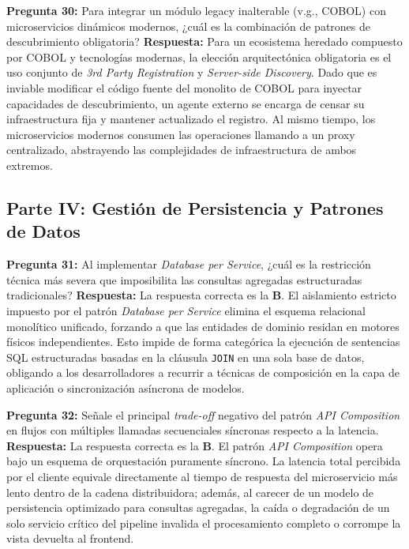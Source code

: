 \vspace{4mm}

\noindent\textbf{Pregunta 30:} Para integrar un módulo legacy inalterable (v.g., COBOL) con microservicios dinámicos modernos, ¿cuál es la combinación de patrones de descubrimiento obligatoria?
\newline
\textbf{Respuesta:} Para un ecosistema heredado compuesto por COBOL y tecnologías modernas, la elección arquitectónica obligatoria es el uso conjunto de \textit{3rd Party Registration} y \textit{Server-side Discovery}. Dado que es inviable modificar el código fuente del monolito de COBOL para inyectar capacidades de descubrimiento, un agente externo se encarga de censar su infraestructura fija y mantener actualizado el registro. Al mismo tiempo, los microservicios modernos consumen las operaciones llamando a un proxy centralizado, abstrayendo las complejidades de infraestructura de ambos extremos.

\subsection*{Parte IV: Gestión de Persistencia y Patrones de Datos}

\noindent\textbf{Pregunta 31:} Al implementar \textit{Database per Service}, ¿cuál es la restricción técnica más severa que imposibilita las consultas agregadas estructuradas tradicionales?
\newline
\textbf{Respuesta:} La respuesta correcta es la \textbf{B}. El aislamiento estricto impuesto por el patrón \textit{Database per Service} elimina el esquema relacional monolítico unificado, forzando a que las entidades de dominio residan en motores físicos independientes. Esto impide de forma categórica la ejecución de sentencias SQL estructuradas basadas en la cláusula \texttt{JOIN} en una sola base de datos, obligando a los desarrolladores a recurrir a técnicas de composición en la capa de aplicación o sincronización asíncrona de modelos.

\vspace{4mm}

\noindent\textbf{Pregunta 32:} Señale el principal \textit{trade-off} negativo del patrón \textit{API Composition} en flujos con múltiples llamadas secuenciales síncronas respecto a la latencia.
\newline
\textbf{Respuesta:} La respuesta correcta es la \textbf{B}. El patrón \textit{API Composition} opera bajo un esquema de orquestación puramente síncrono. La latencia total percibida por el cliente equivale directamente al tiempo de respuesta del microservicio más lento dentro de la cadena distribuidora; además, al carecer de un modelo de persistencia optimizado para consultas agregadas, la caída o degradación de un solo servicio crítico del pipeline invalida el procesamiento completo o corrompe la vista devuelta al frontend.

